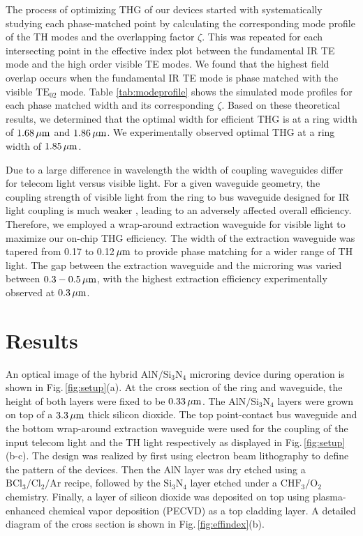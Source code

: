 \documentclass[9pt,twocolumn,twoside]{optica}
\begin{document}
The process of optimizing THG of our devices started with systematically studying each phase-matched point by calculating the corresponding mode profile of the TH modes and the overlapping factor $\zeta$.  This was repeated for each intersecting point in the effective index plot between the fundamental IR TE mode and the high order visible TE modes. We found that the highest field overlap occurs when the fundamental IR TE mode is phase matched with the visible $\mathrm{TE_{02}}$ mode. Table \ref{tab:modeprofile} shows the simulated mode profiles for each phase matched width and its corresponding $\zeta$. Based on these theoretical results, we determined that the optimal width for efficient THG is at a ring width of $1.68\thinspace\mu \mathrm{m}$ and $1.86\thinspace\mu \mathrm{m}$. We experimentally observed optimal THG at a ring width of $1.85\thinspace\mu \mathrm{m}$.

Due to a large difference in wavelength the width of coupling waveguides differ for telecom light versus visible light. For a given waveguide geometry, the coupling strength of visible light from the ring to bus waveguide designed for IR light coupling is much weaker \cite{Guo2:16}, leading to an adversely affected overall efficiency. Therefore, we employed a wrap-around extraction waveguide for visible light to maximize our on-chip THG efficiency. The width of the extraction waveguide was tapered from 0.17 to 0.12$\thinspace\mu \mathrm{m}$ to provide phase matching for a wider range of TH light. The gap between the extraction waveguide and the microring was varied between $0.3-0.5\thinspace \mu \mathrm{m}$, with the highest extraction efficiency experimentally observed at $0.3\thinspace\mu\mathrm{m}$.

\section{Results}

An optical image of the hybrid $\mathrm{AlN/Si_{3}N_{4}}$ microring device during operation is shown in Fig.$\,$\ref{fig:setup}(a). At the cross section of the ring and waveguide, the height of both layers were fixed to be $0.33\thinspace\mu \mathrm{m}$. The $\mathrm{AlN/Si_{3}N_{4}}$ layers were grown on top of a $3.3\thinspace\mu \mathrm{m}$ thick silicon dioxide. The top point-contact bus waveguide and the bottom wrap-around extraction waveguide were used for the coupling of the input telecom light and the TH light respectively as displayed in Fig.$\,$\ref{fig:setup}(b-c). The design was realized by first using electron beam lithography to define the pattern of the devices. Then the $\mathrm{AlN}$ layer was dry etched using a $\mathrm{BCl_{3}/Cl_{2}/Ar}$ recipe, followed by the $\mathrm{Si_{3}N_{4}}$ layer etched under a $\mathrm{CHF_{3}/O_{2}}$ chemistry. Finally, a layer of silicon dioxide was deposited on top using plasma-enhanced chemical vapor deposition (PECVD) as a top cladding layer. A detailed diagram of the cross section is shown in Fig.$\,$\ref{fig:effindex}(b). 
\end{document}
